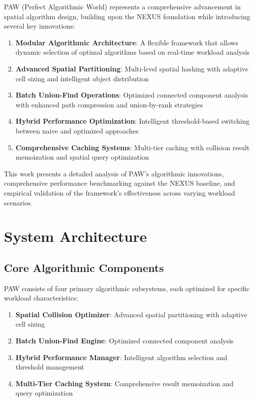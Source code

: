 \documentclass[10pt]{article}
\begin{document}
PAW (Perfect Algorithmic World) represents a comprehensive advancement in spatial algorithm design, building upon the NEXUS foundation while introducing several key innovations:

\begin{enumerate}
    \item \textbf{Modular Algorithmic Architecture}: A flexible framework that allows dynamic selection of optimal algorithms based on real-time workload analysis
    \item \textbf{Advanced Spatial Partitioning}: Multi-level spatial hashing with adaptive cell sizing and intelligent object distribution
    \item \textbf{Batch Union-Find Operations}: Optimized connected component analysis with enhanced path compression and union-by-rank strategies
    \item \textbf{Hybrid Performance Optimization}: Intelligent threshold-based switching between naive and optimized approaches
    \item \textbf{Comprehensive Caching Systems}: Multi-tier caching with collision result memoization and spatial query optimization
\end{enumerate}

This work presents a detailed analysis of PAW's algorithmic innovations, comprehensive performance benchmarking against the NEXUS baseline, and empirical validation of the framework's effectiveness across varying workload scenarios.

\section{System Architecture}

\subsection{Core Algorithmic Components}

PAW consists of four primary algorithmic subsystems, each optimized for specific workload characteristics:

\begin{enumerate}
    \item \textbf{Spatial Collision Optimizer}: Advanced spatial partitioning with adaptive cell sizing
    \item \textbf{Batch Union-Find Engine}: Optimized connected component analysis
    \item \textbf{Hybrid Performance Manager}: Intelligent algorithm selection and threshold management
    \item \textbf{Multi-Tier Caching System}: Comprehensive result memoization and query optimization
\end{enumerate}
\end{document}
